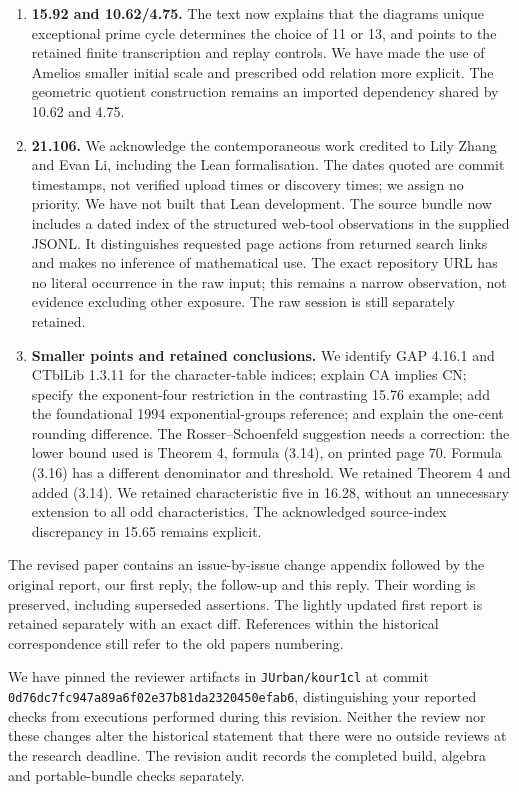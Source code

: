 \begin{enumerate}
  with its imported theorems still credited.
\item
  \textbf{15.92 and 10.62/4.75.} The text now explains that the
  diagram\textquotesingle s unique exceptional prime cycle determines
  the choice of 11 or 13, and points to the retained finite
  transcription and replay controls. We have made the use of
  Amelio\textquotesingle s smaller initial scale and prescribed odd
  relation more explicit. The geometric quotient construction remains an
  imported dependency shared by 10.62 and 4.75.
\item
  \textbf{21.106.} We acknowledge the contemporaneous work credited to
  Lily Zhang and Evan Li, including the Lean formalisation. The dates
  quoted are commit timestamps, not verified upload times or discovery
  times; we assign no priority. We have not built that Lean development.
  The source bundle now includes a dated index of the structured
  web-tool observations in the supplied JSONL. It distinguishes
  requested page actions from returned search links and makes no
  inference of mathematical use. The exact repository URL has no literal
  occurrence in the raw input; this remains a narrow observation, not
  evidence excluding other exposure. The raw session is still separately
  retained.
\item
  \textbf{Smaller points and retained conclusions.} We identify GAP
  4.16.1 and CTblLib 1.3.11 for the character-table indices; explain CA
  implies CN; specify the exponent-four restriction in the contrasting
  15.76 example; add the foundational 1994 exponential-groups reference;
  and explain the one-cent rounding difference. The Rosser--Schoenfeld
  suggestion needs a correction: the lower bound used is Theorem 4,
  formula (3.14), on printed page 70. Formula (3.16) has a different
  denominator and threshold. We retained Theorem 4 and added (3.14). We
  retained characteristic five in 16.28, without an unnecessary
  extension to all odd characteristics. The acknowledged source-index
  discrepancy in 15.65 remains explicit.
\end{enumerate}

The revised paper contains an issue-by-issue change appendix followed by
the original report, our first reply, the follow-up and this reply.
Their wording is preserved, including superseded assertions. The lightly
updated first report is retained separately with an exact diff.
References within the historical correspondence still refer to the old
paper\textquotesingle s numbering.

We have pinned the reviewer artifacts in \nolinkurl{JUrban/kour1cl} at
commit \nolinkurl{0d76dc7fc947a89a6f02e37b81da2320450efab6},
distinguishing your reported checks from executions performed during
this revision. Neither the review nor these changes alter the historical
statement that there were no outside reviews at the research deadline.
The revision audit records the completed build, algebra and
portable-bundle checks separately.
